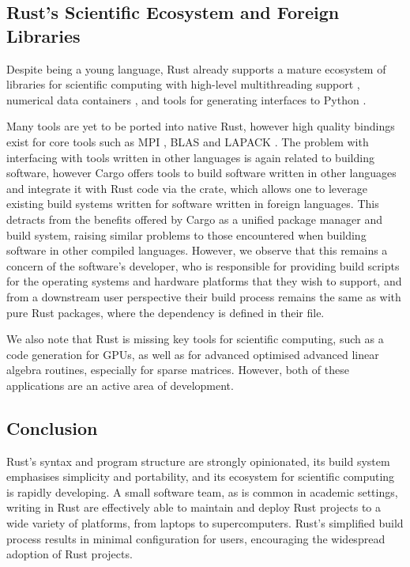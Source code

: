 \subsection*{Rust's Scientific Ecosystem and Foreign Libraries}

Despite being a young language, Rust already supports a mature ecosystem of libraries for scientific computing with high-level multithreading support \cite{rayon2018github}, numerical data containers \cite{ndarray2022github}, and tools for generating interfaces to Python \cite{maturin2022github}.

Many tools are yet to be ported into native Rust, however high quality bindings exist for core tools such as MPI \cite{rsmpi2018github}, BLAS and LAPACK \cite{blaslapackrust2022github}. The problem with interfacing with tools written in other languages is again related to building software, however Cargo offers tools to build software written in other languages and integrate it with Rust code via the  crate, which allows one to leverage existing build systems written for software written in foreign languages. This detracts from the benefits offered by Cargo as a unified package manager and build system, raising similar problems to those encountered when building software in other compiled languages. However, we observe that this remains a concern of the software's developer, who is responsible for providing build scripts for the operating systems and hardware platforms that they wish to support, and from a downstream user perspective their build process remains the same as with pure Rust packages, where the dependency is defined in their  file.

We also note that Rust is missing key tools for scientific computing, such as a code generation for GPUs, as well as for advanced optimised advanced linear algebra routines, especially for sparse matrices. However, both of these applications are an active area of development.

\subsection*{Conclusion}

Rust's syntax and program structure are strongly opinionated, its build system emphasises simplicity and portability, and its ecosystem for scientific computing is rapidly developing. A small software team, as is common in academic settings, writing in Rust are effectively able to maintain and deploy Rust projects to a wide variety of platforms, from laptops to supercomputers. Rust's simplified build process results in minimal configuration for users, encouraging the widespread adoption of Rust projects.

